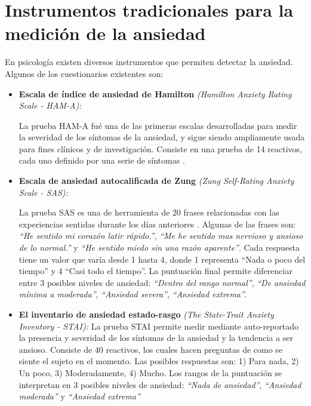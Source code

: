 \section{Instrumentos tradicionales para la medici\'on de la ansiedad}
        En psicolog\'ia existen diversos instrumentos que permiten detectar la ansiedad. Algunos de los cuestionarios existentes son:
        \begin{itemize}

		\item \textbf{Escala de \'indice de ansiedad de Hamilton} \textit{(Hamilton Anxiety Rating Scale - HAM-A):}

			La prueba HAM-A fu\'e una de las primeras escalas desarrolladas para medir la severidad de los s\'intomas de la ansiedad, y sigue siendo ampliamente usada para fines cl\'inicos y de investigaci\'on. Consiste en una prueba de 14 reactivos, cada uno definido por una serie de s\'intomas \citep{PAPT467}.
		\item \textbf{Escala de ansiedad autocalificada de Zung} \textit{(Zung Self-Rating Anxiety Scale - SAS):}

			La prueba SAS es una de herramienta de 20 frases relacionadas con las experiencias sentidas durante los d\'ias anteriores \citep{Zung1971371}. Algunas de las frases son: \textit{``He sentido mi coraz\'on latir r\'apido.''}, \textit{``Me he sentido mas nervioso y ansioso de lo normal.''} y \textit{``He sentido miedo sin una raz\'on aparente''}. Cada respuesta tiene un valor que var\'ia desde 1 hasta 4, donde 1 representa ``Nada o poco del tiempo'' y 4 ``Casi todo el tiempo''. La puntuaci\'on final permite diferenciar entre 3 posibles niveles de ansiedad: \textit{``Dentro del rango normal''}, \textit{``De ansiedad m\'inima a moderada''}, \textit{``Ansiedad severa''}, \textit{``Ansiedad extrema''}.
		\item \textbf{El inventario de ansiedad estado-rasgo} \textit{(The State-Trait Anxiety Inventory - STAI):}
			La prueba STAI permite medir mediante auto-reportado la presencia y severidad de los s\'intomas de la ansiedad y la tendencia a ser ansioso\citep{julian2011measures}. Consiste de 40 reactivos, los cuales hacen preguntas de como se siente el sujeto en el momento. Las posibles respuestas son: 1) Para nada, 2) Un poco, 3) Moderadamente, 4) Mucho. Los rangos de la puntuaci\'on se interpretan en 3 posibles niveles de ansiedad: \textit{``Nada de ansiedad''}, \textit{``Ansiedad moderada''} y \textit{``Ansiedad extrema''}


\end{itemize}
